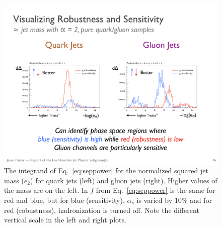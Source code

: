 \begin{figure}[h!]
\begin{center}
\includegraphics[width = 0.99\columnwidth]{figures/differentialseparation.pdf}
\end{center}
\caption{The integrand of Eq.~\ref{eq:seppower} for the normalized
  squared jet mass ($e_2$) for quark jets (left) and gluon jets
  (right).  Higher values of the mass are on the left.  In $f$ from
  Eq.~\ref{eq:seppower} is the same for red and blue, but for blue
  (sensitivity), $\alpha_s$ is varied by 10\% and for red
  (robustness), hadronization is turned off.  Note the different vertical scale in the left and right plots. }
\label{fig:differentialseparation}
\end{figure}

